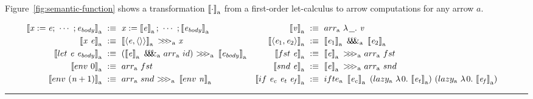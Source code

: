 \documentclass[preprint]{sigplanconf}
\newcommand{\arrow}{\rightsquigarrow}
\newcommand{\arrowarr}{\ensuremath{arr}}
\newcommand{\arrowcomp}{\ensuremath{{>}\mspace{-6mu}{>}\mspace{-6mu}{>}}}
\newcommand{\arrowpair}{\ensuremath{\mathit{\&\mspace{-7.5mu}\&\mspace{-7.5mu}\&}}}
\newcommand{\arrowif}{\ensuremath{ifte}}
\newcommand{\arrowlazy}{\ensuremath{lazy}}
\newcommand{\gen}{_\mathrm{a}}
\begin{document}
Figure~\ref{fig:semantic-function} shows a transformation $\meaningof{\cdot}\gen$ from a first-order let-calculus to arrow computations for any arrow $a$.

\begin{figure*}[t]\centering
\begin{align*}
\begin{aligned}[t]
	\meaningof{\mathit{x} := \mathit{e};\ \cdots\ ; \mathit{e_{body}}}\gen &\ :\equiv\
		\mathit{x} := \meaningof{\mathit{e}}\gen;\ \cdots \ ; \meaningof{\mathit{e_{body}}}\gen \\
	\meaningof{\mathit{x}~\mathit{e}}\gen &\ :\equiv\
		\meaningof{\pair{\mathit{e},\pair{}}}\gen~\arrowcomp\gen~\mathit{x}
\\
	\meaningof{let~\mathit{e}~\mathit{e_{body}}}\gen &\ :\equiv\ 
		(\meaningof{\mathit{e}}\gen~\arrowpair\gen~\arrowarr\gen~id)~
			\arrowcomp\gen~
		\meaningof{\mathit{e_{body}}}\gen
\\
	\meaningof{env~0}\gen &\ :\equiv\ \arrowarr\gen~fst
\\
	\meaningof{env~(\mathit{n}+1)}\gen &\ :\equiv\ \arrowarr\gen~snd~\arrowcomp\gen~\meaningof{env~\mathit{n}}\gen
\end{aligned}
&\tab
\begin{aligned}[t]
	\meaningof{\mathit{v}}\gen &\ :\equiv\ \arrowarr\gen~\fun{\underline{\ \ }}{\mathit{v}}
\\
	\meaningof{\pair{\mathit{e}_1,\mathit{e}_2}}\gen &\ :\equiv\
		\meaningof{\mathit{e}_1}\gen~\arrowpair\gen~\meaningof{\mathit{e}_2}\gen
\\
	\meaningof{fst~\mathit{e}}\gen &\ :\equiv\
		\meaningof{\mathit{e}}\gen~\arrowcomp\gen~\arrowarr\gen~fst
\\
	\meaningof{snd~\mathit{e}}\gen &\ :\equiv\
		\meaningof{\mathit{e}}\gen~\arrowcomp\gen~\arrowarr\gen~snd
\\
	\meaningof{if~\mathit{e_c}~\mathit{e_t}~\mathit{e_f}}\gen &\ :\equiv\
		\arrowif\gen~
			\meaningof{\mathit{e_c}}\gen~
			(\arrowlazy\gen~\fun{0}{\meaningof{\mathit{e_t}}\gen})~
			(\arrowlazy\gen~\fun{0}{\meaningof{\mathit{e_f}}\gen})
\end{aligned}
\end{align*}
\hrule
\caption{Transformation from a let-calculus with first-order definitions and De-Bruijn-indexed bindings to computations in arrow $\mathrm{a}$.
}
\label{fig:semantic-function}
\end{figure*}
\end{document}
